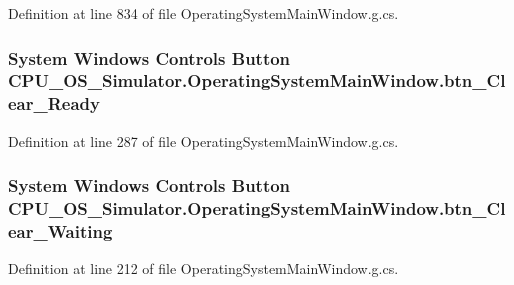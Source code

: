 Definition at line 834 of file Operating\+System\+Main\+Window.\+g.\+cs.

\hypertarget{class_c_p_u___o_s___simulator_1_1_operating_system_main_window_a926540a5fc98f177282e425055964cb9}{}
\subsubsection[{btn\+\_\+\+Clear\+\_\+\+Ready}]{\setlength{\rightskip}{0pt plus 5cm}System Windows Controls Button C\+P\+U\+\_\+\+O\+S\+\_\+\+Simulator.\+Operating\+System\+Main\+Window.\+btn\+\_\+\+Clear\+\_\+\+Ready\hspace{0.3cm}{\ttfamily [package]}}\label{class_c_p_u___o_s___simulator_1_1_operating_system_main_window_a926540a5fc98f177282e425055964cb9}


Definition at line 287 of file Operating\+System\+Main\+Window.\+g.\+cs.

\hypertarget{class_c_p_u___o_s___simulator_1_1_operating_system_main_window_abbbabd3ef96781478b77ea937e312eb1}{}
\subsubsection[{btn\+\_\+\+Clear\+\_\+\+Waiting}]{\setlength{\rightskip}{0pt plus 5cm}System Windows Controls Button C\+P\+U\+\_\+\+O\+S\+\_\+\+Simulator.\+Operating\+System\+Main\+Window.\+btn\+\_\+\+Clear\+\_\+\+Waiting\hspace{0.3cm}{\ttfamily [package]}}\label{class_c_p_u___o_s___simulator_1_1_operating_system_main_window_abbbabd3ef96781478b77ea937e312eb1}


Definition at line 212 of file Operating\+System\+Main\+Window.\+g.\+cs.

